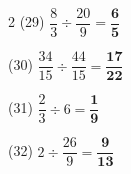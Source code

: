 \documentclass[a4paper, 11pt]{ltjsarticle}
\begin{document}
\begin{multicols*}{2}
\noindent (29) \quad $\dfrac{8}{3}\div\dfrac{20}{9} = \mathbf{\dfrac{6}{5}}$
\vspace*{\fill}

\noindent (30) \quad $\dfrac{34}{15}\div\dfrac{44}{15} = \mathbf{\dfrac{17}{22}}$
\vspace*{\fill}

\noindent (31) \quad $\dfrac{2}{3}\div6 = \mathbf{\dfrac{1}{9}}$
\vspace*{\fill}

\noindent (32) \quad $2\div\dfrac{26}{9} = \mathbf{\dfrac{9}{13}}$
\vspace*{\fill}

\end{multicols*}
\end{document}
